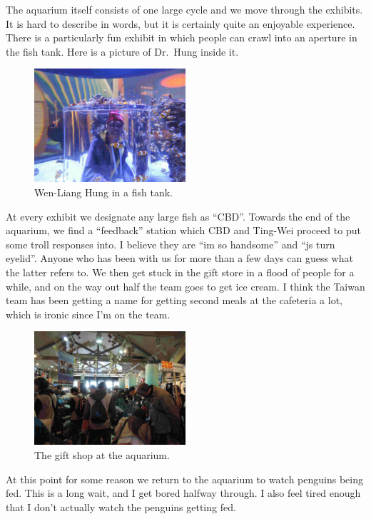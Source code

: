 \documentclass[11pt]{scrreprt}
\numberwithin{figure}{chapter}
\begin{document}
The aquarium itself consists of one large cycle and we move through the exhibits.
It is hard to describe in words, but it is certainly quite an enjoyable experience.
There is a particularly fun exhibit in which people can crawl into an aperture in the fish tank.
Here is a picture of Dr.\ Hung inside it.

\begin{figure}[ht]
  \centering
  \includegraphics[width=0.5\textwidth]{media/aquarium.jpg}
  \caption{Wen-Liang Hung in a fish tank.}
\end{figure}


At every exhibit we designate any large fish as ``CBD''.
Towards the end of the aquarium, we find a ``feedback'' station which CBD and Ting-Wei proceed to put some troll responses into. I believe they are ``im so handsome'' and ``js turn eyelid''. Anyone who has been with us for more than a few days can guess what the latter refers to.
We then get stuck in the gift store in a flood of people for a while, and on the way out half the team goes to get ice cream.
I think the Taiwan team has been getting a name for getting second meals at the cafeteria a lot, which is ironic since I'm on the team.

\begin{figure}[ht]
  \centering
  \includegraphics[width=0.5\textwidth]{media/giftshop.jpg}
  \caption{The gift shop at the aquarium.}
\end{figure}

At this point for some reason we return to the aquarium to watch penguins being fed.
This is a long wait, and I get bored halfway through. I also feel tired enough that
I don't actually watch the penguins getting fed.
\end{document}
